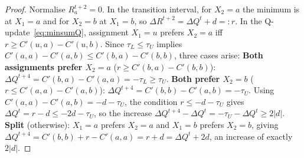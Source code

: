 \begin{proof}
Normalise $R^{t+2}_a = 0$.  In the transition interval, for $X_2=a$ the minimum is at $X_1=a$ and for $X_2=b$ at $X_1=b$, so $\Delta R^{t+2} = \Delta Q^t + d =: r$.
In the Q-update~\eqref{eq:minsumQ}, assignment $X_1=u$ prefers $X_2 = a$ iff $r \geq C'(u,a)-C'(u,b)$.  Since $\tau_L \leq \tau_U$ implies $C'(a,a)-C'(a,b) \leq C'(b,a)-C'(b,b)$, three cases arise:
\textbf{Both assignments prefer $X_2 = a$} ($r \geq C'(b,a)-C'(b,b)$): $\Delta Q^{t+4} = C'(b,a)-C'(a,a) = -\tau_L \geq \tau_U$.
\textbf{Both prefer $X_2 = b$} ($r \leq C'(a,a)-C'(a,b)$): $\Delta Q^{t+4} = C'(b,b)-C'(a,b) = -\tau_U$.  Using $C'(a,a)-C'(a,b) = -d-\tau_U$, the condition $r \leq -d-\tau_U$ gives $\Delta Q^t = r-d \leq -2d-\tau_U$, so the increase $\Delta Q^{t+4}-\Delta Q^t = -\tau_U-\Delta Q^t \geq 2|d|$.
\textbf{Split} (otherwise): $X_1=a$ prefers $X_2=a$ and $X_1=b$ prefers $X_2=b$, giving $\Delta Q^{t+4} = C'(b,b)+r-C'(a,a) = r+d = \Delta Q^t+2d$, an increase of exactly $2|d|$. \qedhere
\end{proof}
